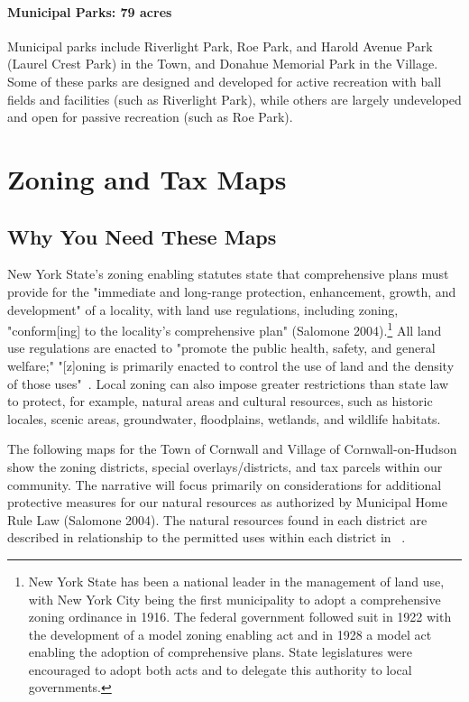 \paragraph{Municipal Parks: 79 acres}
Municipal parks include Riverlight Park, Roe Park, and Harold Avenue Park 
(Laurel Crest Park) in the Town, and Donahue Memorial Park in the Village. Some 
of these parks are designed and developed for active recreation with ball 
fields and facilities (such as Riverlight Park), while others are largely 
undeveloped and open for passive recreation (such as Roe Park).

\label{map:protectedopenspace}
\section{Zoning and Tax Maps}\label{subsec:zoning}
\subsection*{Why You Need These Maps}
New York State's zoning enabling statutes state that comprehensive plans must 
provide for the "immediate and long-range protection, enhancement, growth, and 
development" of a locality, with land use regulations, including zoning, 
"conform[ing] to the locality's comprehensive plan" (Salomone
2004).\footnote{New York State has been a national leader in the management of
land use, with New York City being the first municipality to adopt a
comprehensive zoning ordinance in 1916. The federal government followed suit in
1922 with the development of a model zoning enabling act and in 1928 a model
act enabling the adoption of comprehensive plans.  State legislatures were
encouraged to adopt both acts and to delegate this authority to local
governments.} All land use regulations are enacted to "promote the public
health, safety, and general welfare;" "[z]oning is primarily enacted to control
the use of land and the density of those uses"~\citep{haeckel2014}.  Local
zoning can also impose greater restrictions than state law to protect, for
example, natural areas and cultural resources, such as historic locales, scenic
areas, groundwater, floodplains, wetlands, and wildlife habitats.

The following maps for the Town of Cornwall and Village of Cornwall-on-Hudson 
show the zoning districts, special overlays/districts, and tax parcels within 
our community. The narrative will focus primarily on considerations for 
additional protective measures for our natural resources as authorized by 
Municipal Home Rule Law (Salomone 2004). The natural resources found in each 
district are described in relationship to the permitted uses within each 
district in ~.

